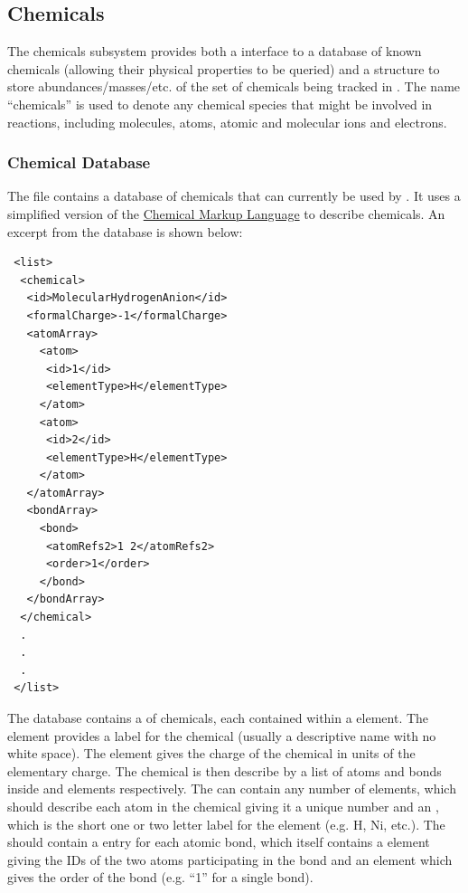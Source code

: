 \subsection{Chemicals}\label{sec:ChemicalSubsystem}

The chemicals subsystem provides both a interface to a database of known chemicals (allowing their physical properties to be queried) and a structure to store abundances/masses/etc. of the set of chemicals being tracked in \glc. The name ``chemicals'' is used to denote any chemical species that might be involved in reactions, including molecules, atoms, atomic and molecular ions and electrons.

\subsubsection{Chemical Database}

The file  contains a database of chemicals that can currently be used by \glc. It uses a simplified version of the \href{http://www.xml-cml.org}{Chemical Markup Language} to describe chemicals. An excerpt from the database is shown below:
\begin{verbatim}
 <list>
  <chemical>
   <id>MolecularHydrogenAnion</id>
   <formalCharge>-1</formalCharge>
   <atomArray>
     <atom>
      <id>1</id>
      <elementType>H</elementType>
     </atom>
     <atom>
      <id>2</id>
      <elementType>H</elementType>
     </atom>
   </atomArray>
   <bondArray>
     <bond>
      <atomRefs2>1 2</atomRefs2>
      <order>1</order>
     </bond>
   </bondArray>
  </chemical>
  .
  .
  .
 </list>
\end{verbatim}
The database contains a  of chemicals, each contained within a  element. The  element provides a label for the chemical (usually a descriptive name with no white space). The  element gives the charge of the chemical in units of the elementary charge. The chemical is then describe by a list of atoms and bonds inside  and  elements respectively. The  can contain any number of  elements, which should describe each atom in the chemical giving it a unique  number and an , which is the short one or two letter label for the element (e.g. H, Ni, etc.). The  should contain a  entry for each atomic bond, which itself contains a  element giving the IDs of the two atoms participating in the bond and an  element which gives the order of the bond (e.g. ``1'' for a single bond).

